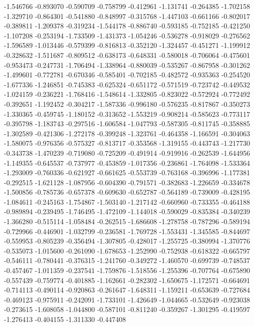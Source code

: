 -1.546766
-0.893070
-0.590709
-0.758799
-0.412961
-1.131741
-0.264385
-1.702158
-1.329710
-0.864301
-0.541880
-0.848997
-0.315768
-1.447103
-0.661166
-0.802017
-0.389811
-1.209378
-0.319234
-1.544178
-0.886740
-0.593185
-0.752185
-0.421250
-1.107208
-0.253194
-1.733509
-1.431373
-1.054246
-0.536278
-0.918029
-0.276562
-1.596589
-1.013446
-0.579399
-0.816813
-0.352120
-1.324457
-0.451271
-1.199912
-0.328632
-1.511687
-0.809512
-0.638173
-0.648331
-0.580018
-0.706064
-0.475601
-0.953473
-0.247731
-1.706494
-1.338964
-0.880039
-0.535267
-0.867958
-0.301262
-1.499601
-0.772781
-0.670346
-0.585401
-0.702185
-0.482572
-0.935363
-0.254520
-1.677336
-1.246851
-0.745383
-0.625324
-0.651172
-0.571519
-0.723742
-0.449532
-1.024159
-0.236221
-1.768416
-1.548614
-1.332805
-0.823022
-0.572924
-0.772492
-0.392651
-1.192452
-0.304217
-1.587336
-0.996180
-0.576235
-0.817867
-0.350273
-1.330365
-0.459745
-1.180152
-0.313652
-1.553219
-0.908214
-0.585623
-0.773117
-0.395798
-1.183743
-0.297516
-1.606584
-1.047793
-0.587305
-0.811745
-0.358885
-1.302589
-0.421306
-1.272178
-0.399248
-1.323761
-0.464358
-1.166591
-0.304063
-1.580075
-0.976356
-0.575327
-0.813717
-0.353568
-1.319155
-0.443743
-1.217730
-0.343738
-1.470239
-0.719080
-0.725209
-0.491914
-0.919916
-0.262539
-1.644956
-1.149355
-0.645537
-0.737977
-0.453859
-1.017356
-0.236861
-1.764098
-1.533364
-1.293009
-0.760336
-0.621927
-0.661625
-0.553739
-0.763168
-0.396996
-1.177381
-0.292515
-1.621128
-1.087956
-0.604390
-0.791571
-0.382683
-1.226659
-0.334678
-1.500856
-0.785736
-0.657378
-0.609630
-0.652787
-0.564189
-0.739009
-0.428195
-1.084611
-0.245163
-1.754867
-1.503140
-1.217142
-0.660960
-0.733355
-0.464188
-0.989894
-0.239495
-1.746495
-1.472109
-1.144018
-0.590029
-0.835384
-0.340239
-1.366280
-0.515114
-1.058484
-0.262515
-1.686608
-1.278758
-0.787296
-0.589194
-0.729966
-0.446901
-1.032799
-0.236581
-1.769728
-1.553431
-1.345585
-0.844697
-0.559953
-0.805239
-0.356494
-1.307805
-0.428017
-1.255725
-0.380994
-1.370776
-0.535073
-1.015600
-0.261090
-1.678653
-1.252990
-0.752938
-0.618322
-0.665797
-0.546111
-0.780441
-0.376315
-1.241760
-0.349272
-1.460570
-0.699739
-0.748537
-0.457467
-1.011359
-0.237541
-1.759876
-1.518556
-1.255396
-0.707764
-0.675890
-0.557439
-0.759774
-0.401885
-1.162661
-0.282302
-1.650675
-1.172571
-0.664691
-0.714113
-0.490114
-0.920863
-0.261647
-1.648311
-1.159211
-0.653639
-0.727684
-0.469123
-0.975911
-0.242091
-1.733101
-1.426649
-1.044665
-0.532649
-0.923038
-0.273615
-1.608058
-1.044800
-0.587101
-0.811240
-0.359267
-1.301295
-0.419597
-1.276413
-0.404155
-1.311330
-0.447408

